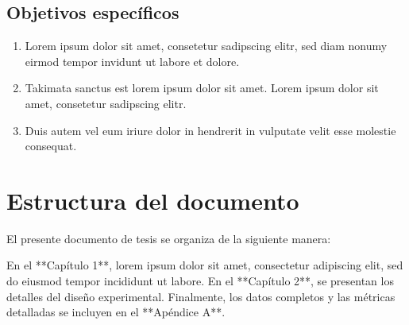 \subsection{Objetivos específicos}

\begin{enumerate}
    \item Lorem ipsum dolor sit amet, consetetur sadipscing elitr, sed diam nonumy eirmod tempor
        invidunt ut labore et dolore.
    \item Takimata sanctus est lorem ipsum dolor sit amet. Lorem ipsum dolor sit amet, consetetur
        sadipscing elitr.
    \item Duis autem vel eum iriure dolor in hendrerit in vulputate velit esse molestie consequat.
\end{enumerate}

\section{Estructura del documento}

El presente documento de tesis se organiza de la siguiente manera:

En el **Capítulo 1**, lorem ipsum dolor sit amet, consectetur adipiscing elit, sed do eiusmod
tempor incididunt ut labore. En el **Capítulo 2**, se presentan los detalles del diseño
experimental. Finalmente, los datos completos y las métricas detalladas se incluyen en el **Apéndice A**.
